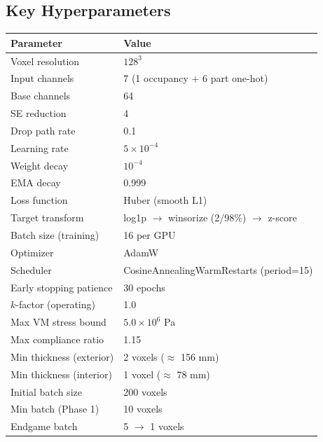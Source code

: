 \documentclass[11pt, letterpaper]{article}
\begin{document}
\subsection{Key Hyperparameters}
\begin{tabular}{ll}
  \toprule
  \textbf{Parameter} & \textbf{Value} \\
  \midrule
  Voxel resolution & $128^3$ \\
  Input channels & 7 (1 occupancy + 6 part one-hot) \\
  Base channels & 64 \\
  SE reduction & 4 \\
  Drop path rate & 0.1 \\
  Learning rate & $5 \times 10^{-4}$ \\
  Weight decay & $10^{-4}$ \\
  EMA decay & 0.999 \\
  Loss function & Huber (smooth L1) \\
  Target transform & log1p $\to$ winsorize (2/98\%) $\to$ z-score \\
  Batch size (training) & 16 per GPU \\
  Optimizer & AdamW \\
  Scheduler & CosineAnnealingWarmRestarts (period=15) \\
  Early stopping patience & 30 epochs \\
  \midrule
  $k$-factor (operating) & 1.0 \\
  Max VM stress bound & $5.0 \times 10^6$ Pa \\
  Max compliance ratio & 1.15 \\
  Min thickness (exterior) & 2 voxels ($\approx$ 156 mm) \\
  Min thickness (interior) & 1 voxel ($\approx$ 78 mm) \\
  Initial batch size & 200 voxels \\
  Min batch (Phase 1) & 10 voxels \\
  Endgame batch & 5 $\to$ 1 voxels \\
  \bottomrule
\end{tabular}
\end{document}
